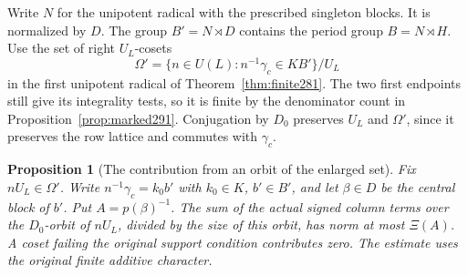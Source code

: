 \documentclass[a4paper,11pt]{article}
\newtheorem{proposition}{Proposition}[section]
\theoremstyle{definition}
\theoremstyle{remark}
\numberwithin{equation}{section}
\begin{document}
Write \(N\) for the unipotent radical with the prescribed
singleton blocks. It is normalized by \(D\). The group
\(B'=N\rtimes D\) contains the period group \(B=N\rtimes H\).
Use the set of right \(U_L\)-cosets
\[
 \Omega'=\{n\in U(L):n^{-1}\gamma_c\in K B'\}/U_L
\]
in the first unipotent radical of Theorem~\ref{thm:finite281}.
The two first endpoints still give its integrality tests,
so it is finite by the denominator count in
Proposition~\ref{prop:marked291}. Conjugation by \(D_0\)
preserves \(U_L\) and \(\Omega'\), since it preserves the
row lattice and commutes with \(\gamma_c\).

\begin{proposition}[The contribution from an orbit of the enlarged set]\leavevmode
\label{prop:affine293}
Fix \(nU_L\in\Omega'\). Write \(n^{-1}\gamma_c=k_0b'\)
with \(k_0\in K\), \(b'\in B'\), and let \(\beta\in D\)
be the central block of \(b'\). Put \(A=p(\beta)^{-1}\).
The sum of the actual signed column terms over the
\(D_0\)-orbit of \(nU_L\), divided by the size of this
orbit, has norm at most \(\Xi(A)\). A coset failing the
original support condition contributes zero. The estimate
uses the original finite additive character.
\end{proposition}
\end{document}
